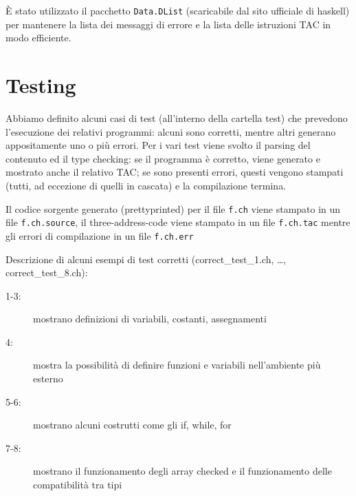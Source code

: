 \documentclass{report}
\newcommand{\term}[1]{\texttt{#1}}
\begin{document}
È stato utilizzato il pacchetto \term{Data.DList} (scaricabile dal sito ufficiale di haskell) per mantenere
la lista dei messaggi di errore e la lista delle istruzioni TAC in modo efficiente.

\section{Testing}

Abbiamo definito alcuni casi di test (all'interno della cartella test) che prevedono l'esecuzione dei
relativi programmi: alcuni sono corretti, mentre altri generano appositamente uno o più errori. Per i vari 
test viene svolto il parsing del contenuto ed il type checking: se il programma è corretto, viene generato 
e mostrato anche il relativo TAC; se sono presenti errori, questi vengono stampati (tutti, ad eccezione
di quelli in cascata) e la compilazione termina.

Il codice sorgente generato (prettyprinted) per il file \term{f.ch} viene stampato in un file \term{f.ch.source},
il three-address-code viene stampato in un file \term{f.ch.tac} mentre gli errori di compilazione in un file
\term{f.ch.err}

Descrizione di alcuni esempi di test corretti (correct\_test\_1.ch, …, correct\_test\_8.ch):
\begin{description}
    \item[1-3:] mostrano definizioni di variabili, costanti, assegnamenti
    \item[4:] mostra la possibilità di definire funzioni e variabili nell'ambiente più esterno
    \item[5-6:] mostrano alcuni costrutti come gli if, while, for
    \item[7-8:] mostrano il funzionamento degli array checked e il funzionamento delle compatibilità tra tipi

\end{description}
\end{document}
